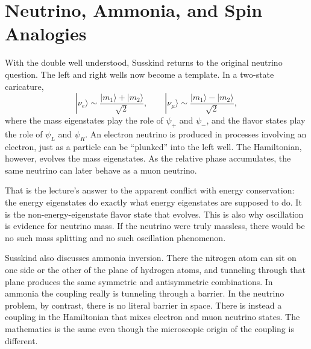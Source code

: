 \section{Neutrino, Ammonia, and Spin Analogies}

With the double well understood, Susskind returns to the original neutrino question. The left and right wells now become a template. In a two-state caricature,
\begin{equation}
|\nu_e\rangle \sim \frac{|m_1\rangle+|m_2\rangle}{\sqrt{2}},
\qquad
|\nu_\mu\rangle \sim \frac{|m_1\rangle-|m_2\rangle}{\sqrt{2}},
\end{equation}
where the mass eigenstates play the role of \(\psi_+\) and \(\psi_-\), and the flavor states play the role of \(\psi_L\) and \(\psi_R\). An electron neutrino is produced in processes involving an electron, just as a particle can be ``plunked'' into the left well. The Hamiltonian, however, evolves the mass eigenstates. As the relative phase accumulates, the same neutrino can later behave as a muon neutrino.

That is the lecture's answer to the apparent conflict with energy conservation: the energy eigenstates do exactly what energy eigenstates are supposed to do. It is the non-energy-eigenstate flavor state that evolves. This is also why oscillation is evidence for neutrino mass. If the neutrino were truly massless, there would be no such mass splitting and no such oscillation phenomenon.

Susskind also discusses ammonia inversion. There the nitrogen atom can sit on one side or the other of the plane of hydrogen atoms, and tunneling through that plane produces the same symmetric and antisymmetric combinations. In ammonia the coupling really is tunneling through a barrier. In the neutrino problem, by contrast, there is no literal barrier in space. There is instead a coupling in the Hamiltonian that mixes electron and muon neutrino states. The mathematics is the same even though the microscopic origin of the coupling is different.

